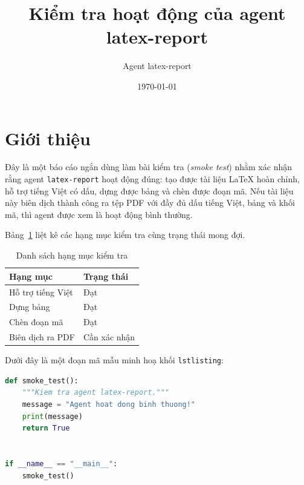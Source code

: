 \documentclass[11pt,a4paper]{article}
\title{Kiểm tra hoạt động của agent latex-report}
\author{Agent latex-report}
\date{\today}
\begin{document}
\maketitle

\section{Giới thiệu}
Đây là một báo cáo ngắn dùng làm bài kiểm tra (\textit{smoke test}) nhằm xác
nhận rằng agent \texttt{latex-report} hoạt động đúng: tạo được tài liệu LaTeX
hoàn chỉnh, hỗ trợ tiếng Việt có dấu, dựng được bảng và chèn được đoạn mã. Nếu
tài liệu này biên dịch thành công ra tệp PDF với đầy đủ dấu tiếng Việt, bảng và
khối mã, thì agent được xem là hoạt động bình thường.

Bảng~\ref{tab:checklist} liệt kê các hạng mục kiểm tra cùng trạng thái mong đợi.

\begin{table}[h]
  \centering
  \caption{Danh sách hạng mục kiểm tra}
  \label{tab:checklist}
  \begin{tabular}{ll}
    \toprule
    \textbf{Hạng mục} & \textbf{Trạng thái} \\
    \midrule
    Hỗ trợ tiếng Việt   & Đạt \\
    Dựng bảng           & Đạt \\
    Chèn đoạn mã        & Đạt \\
    Biên dịch ra PDF    & Cần xác nhận \\
    \bottomrule
  \end{tabular}
\end{table}

Dưới đây là một đoạn mã mẫu minh hoạ khối \texttt{lstlisting}:

\begin{lstlisting}[language=Python, caption={Đoạn mã mẫu in thông báo}]
def smoke_test():
    """Kiem tra agent latex-report."""
    message = "Agent hoat dong binh thuong!"
    print(message)
    return True


if __name__ == "__main__":
    smoke_test()
\end{lstlisting}
\end{document}
